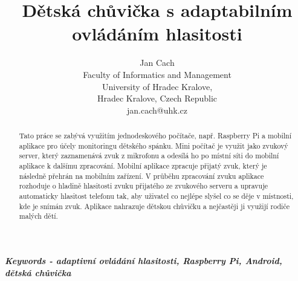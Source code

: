 \documentclass[journal, a4paper]{IEEEtran}
\begin{document}
\title{Dětská chůvička s adaptabilním ovládáním hlasitosti}
\author{Jan Cach\\
Faculty of Informatics and Management\\
University of Hradec Kralove,\\
Hradec Kralove, Czech Republic\\
jan.cach@uhk.cz
}

	\maketitle

\begin{abstract}
	Tato práce se zabývá využitím jednodeskového počítače, např. Raspberry Pi a mobilní aplikace pro účely monitoringu dětského spánku. Mini počítač je využit jako zvukový server, který zaznamenává zvuk z mikrofonu a odesílá ho po místní síti do mobilní aplikace k dalšímu zpracování. Mobilní aplikace zpracuje přijatý zvuk, který je následně přehrán na mobilním zařízení. V průběhu zpracování zvuku aplikace rozhoduje o hladině hlasitosti zvuku přijatého ze zvukového serveru a upravuje automaticky hlasitost telefonu tak, aby uživatel co nejlépe slyšel co se děje v místnosti, kde je snímán zvuk. Aplikace nahrazuje dětskou chůvičku a nejčastěji ji využijí rodiče malých dětí.
\end{abstract}

\textbf{
\textit{
Keywords - adaptivní ovládání hlasitosti, Raspberry Pi, Android, dětská chůvička 
}
}

\end{document}
